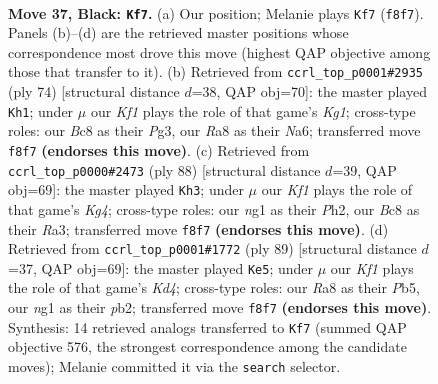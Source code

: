 \documentclass[11pt]{article}
\begin{document}
\clearpage

\begin{figure}[p]\centering
\begin{subfigure}{0.46\textwidth}\centering
\resizebox{\linewidth}{!}{%
\newchessgame
\chessboard[
  setfen={r1b2k1Q/8/2p1p3/p3P3/P4P2/q7/4K3/6N1 b - - 7 37},
  showmover=false,
  pgfstyle=straightmove, color=movearrow, markmove={f8-f7}
]}
\caption{}
\end{subfigure}\hfill
\begin{subfigure}{0.46\textwidth}\centering
\resizebox{\linewidth}{!}{%
\newchessgame
\chessboard[
  setfen={6k1/6p1/N6p/3p1p2/8/4qPP1/7P/1Q4K1 w - - 0 38},
  showmover=false,
  pgfstyle=straightmove, color=movearrow, markmove={g1-h1}
]}
\caption{}
\end{subfigure}
\\[4pt]
\begin{subfigure}{0.46\textwidth}\centering
\resizebox{\linewidth}{!}{%
\newchessgame
\chessboard[
  setfen={8/6k1/1p2p1q1/2p5/P1P3K1/R5P1/7P/4R3 w - - 2 45},
  showmover=false,
  pgfstyle=straightmove, color=movearrow, markmove={g4-h3}
]}
\caption{}
\end{subfigure}\hfill
\begin{subfigure}{0.46\textwidth}\centering
\resizebox{\linewidth}{!}{%
\newchessgame
\chessboard[
  setfen={8/8/p7/1p1k2p1/6P1/3Q3P/KP3P2/2q5 b - - 1 45},
  showmover=false,
  pgfstyle=straightmove, color=movearrow, markmove={d5-e5}
]}
\caption{}
\end{subfigure}
\caption{\textbf{Move 37, Black: \texttt{Kf7}.} (a) Our position; Melanie plays \texttt{Kf7} (\texttt{f8f7}). Panels (b)--(d) are the retrieved master positions whose correspondence most drove this move (highest QAP objective among those that transfer to it). (b) Retrieved from \texttt{ccrl\_top\_p0001\#2935} (ply 74) [structural distance $d$=38, QAP obj=70]: the master played \texttt{Kh1}; under $\mu$ our \emph{Kf1} plays the role of that game's \emph{Kg1}; cross-type roles: our \emph{B}c8 as their \emph{P}g3, our \emph{R}a8 as their \emph{N}a6; transferred move \texttt{f8f7} \textbf{(endorses this move)}. (c) Retrieved from \texttt{ccrl\_top\_p0000\#2473} (ply 88) [structural distance $d$=39, QAP obj=69]: the master played \texttt{Kh3}; under $\mu$ our \emph{Kf1} plays the role of that game's \emph{Kg4}; cross-type roles: our \emph{n}g1 as their \emph{P}h2, our \emph{B}c8 as their \emph{R}a3; transferred move \texttt{f8f7} \textbf{(endorses this move)}. (d) Retrieved from \texttt{ccrl\_top\_p0001\#1772} (ply 89) [structural distance $d$=37, QAP obj=69]: the master played \texttt{Ke5}; under $\mu$ our \emph{Kf1} plays the role of that game's \emph{Kd4}; cross-type roles: our \emph{R}a8 as their \emph{P}b5, our \emph{n}g1 as their \emph{p}b2; transferred move \texttt{f8f7} \textbf{(endorses this move)}. Synthesis: 14 retrieved analogs transferred to \texttt{Kf7} (summed QAP objective 576, the strongest correspondence among the candidate moves); Melanie committed it via the \texttt{search} selector.}
\label{fig:thought-m73}
\end{figure}
\end{document}
